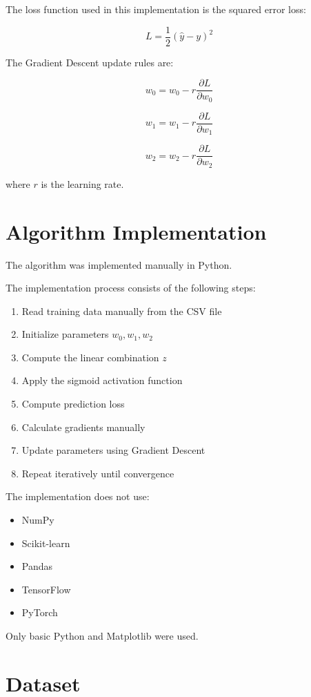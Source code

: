 \documentclass[12pt]{article}
\begin{document}
The loss function used in this implementation is the squared error loss:

\[
L = \frac{1}{2}(\hat{y} - y)^2
\]

The Gradient Descent update rules are:

\[
w_0 = w_0 - r \frac{\partial L}{\partial w_0}
\]

\[
w_1 = w_1 - r \frac{\partial L}{\partial w_1}
\]

\[
w_2 = w_2 - r \frac{\partial L}{\partial w_2}
\]

where \(r\) is the learning rate.

\section{Algorithm Implementation}

The algorithm was implemented manually in Python.

The implementation process consists of the following steps:

\begin{enumerate}
    \item Read training data manually from the CSV file
    \item Initialize parameters \(w_0, w_1, w_2\)
    \item Compute the linear combination \(z\)
    \item Apply the sigmoid activation function
    \item Compute prediction loss
    \item Calculate gradients manually
    \item Update parameters using Gradient Descent
    \item Repeat iteratively until convergence
\end{enumerate}

The implementation does not use:
\begin{itemize}
    \item NumPy
    \item Scikit-learn
    \item Pandas
    \item TensorFlow
    \item PyTorch
\end{itemize}

Only basic Python and Matplotlib were used.

\section{Dataset}
\end{document}
